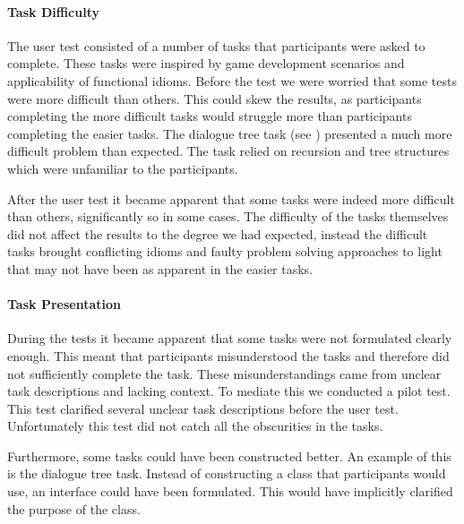 \paragraph{Task Difficulty}
The user test consisted of a number of tasks that participants were asked to complete. These tasks were inspired by game development scenarios and applicability of functional idioms. Before the test we were worried that some tests were more difficult than others. This could skew the results, as participants completing the more difficult tasks would struggle more than participants completing the easier tasks. The dialogue tree task (see ) presented a much more difficult problem than expected. The task relied on recursion and tree structures which were unfamiliar to the participants.

After the user test it became apparent that some tasks were indeed more difficult than others, significantly so in some cases. The difficulty of the tasks themselves did not affect the results to the degree we had expected, instead the difficult tasks brought conflicting idioms and faulty problem solving approaches to light that may not have been as apparent in the easier tasks.

\paragraph{Task Presentation}
During the tests it became apparent that some tasks were not formulated clearly enough. This meant that participants misunderstood the tasks and therefore did not sufficiently complete the task. These misunderstandings came from unclear task descriptions and lacking context. To mediate this we conducted a pilot test. This test clarified several unclear task descriptions before the user test. Unfortunately this test did not catch all the obscurities in the tasks.

Furthermore, some tasks could have been constructed better. An example of this is the dialogue tree task. Instead of constructing a class that participants would use, an interface could have been formulated. This would have implicitly clarified the purpose of the class. 

